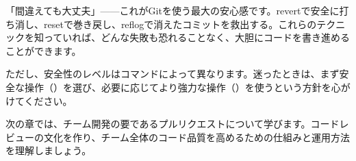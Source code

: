 「間違えても大丈夫」——これがGitを使う最大の安心感です。revertで安全に打ち消し、resetで巻き戻し、reflogで消えたコミットを救出する。これらのテクニックを知っていれば、どんな失敗も恐れることなく、大胆にコードを書き進めることができます。

ただし、安全性のレベルはコマンドによって異なります。迷ったときは、まず安全な操作（）を選び、必要に応じてより強力な操作（）を使うという方針を心がけてください。

次の章では、チーム開発の要であるプルリクエストについて学びます。コードレビューの文化を作り、チーム全体のコード品質を高めるための仕組みと運用方法を理解しましょう。
